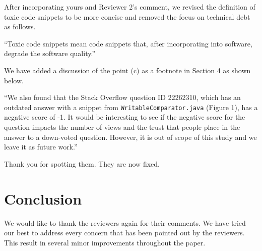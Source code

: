 \documentclass[a4paper,twoside,10pt]{reviewresponse}
\begin{document}

After incorporating yours and Reviewer 2's comment, we revised the definition of toxic code snippets to be more concise and removed the focus on technical debt as follows.

``Toxic code snippets mean code snippets that, after incorporating into software, degrade the software quality.''


We have added a discussion of the point (c) as a footnote in Section 4 as shown below.

``We also found that the Stack Overflow question ID 22262310, which has an outdated answer with a snippet from \texttt{WritableComparator.java} (Figure 1), has a negative score of -1. It would be interesting to see if the negative score for the question impacts the number of views and the trust that people place in the answer to a down-voted question. However, it is out of scope of this study and we leave it as future work.''


Thank you for spotting them. They are now fixed.

\section{Conclusion}
We would like to thank the reviewers again for their comments.
We have tried our best to address every concern that has been pointed out by the reviewers. This result in several minor improvements throughout the paper.

%


\end{document}
